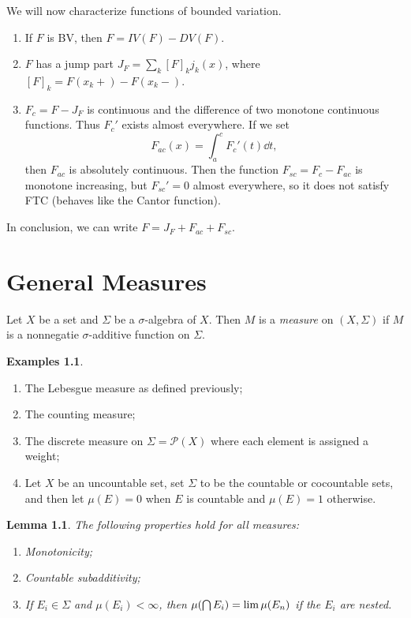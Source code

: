 \documentclass[leqno, openany]{memoir}
\newtheorem{lem}[thm]{Lemma}
\theoremstyle{definition}
\newtheorem{exms}[thm]{Examples}
\theoremstyle{remark}
\theoremstyle{plain}
\theoremstyle{definition}
\theoremstyle{remark}
\newcommand{\mc}[1]{\mathcal{#1}}
\begin{document}
We will now characterize functions of bounded variation.
\begin{enumerate}
    \item If $F$ is BV, then $F = IV(F) - DV(F)$.
    \item $F$ has a jump part $J_F = \sum_k [F]_k j_k(x)$, where $[F]_k = F(x_k+) - F(x_k-)$.
    \item $F_c = F - J_F$ is continuous and the difference of two monotone continuous functions. Thus $F_c'$ exists almost everywhere. If we set
        \[ F_{ac}(x) = \int_a^c F_c'(t) \dd{t}, \]
        then $F_{ac}$ is absolutely continuous. Then the function $F_{sc} = F_c - F_{ac}$ is monotone increasing, but $F_{sc}' = 0$ almost everywhere, so it does not satisfy FTC (behaves like the Cantor function).
\end{enumerate}
In conclusion, we can write $F = J_F + F_{ac} + F_{sc}$.

\chapter{General Measures}%
\label{cha:general_measures}

Let $X$ be a set and $\Sigma$ be a $\sigma$-algebra of $X$. Then $M$ is a \textit{measure} on $(X, \Sigma)$ if $M$ is a nonnegatie $\sigma$-additive function on $\Sigma$.

\begin{exms}
    \begin{enumerate}
        \item The Lebesgue measure as defined previously;
        \item The counting measure;
        \item The discrete measure on $\Sigma = \mc{P}(X)$ where each element is assigned a weight;
        \item Let $X$ be an uncountable set, set $\Sigma$ to be the countable or cocountable sets, and then let $\mu(E) = 0$ when $E$ is countable and $\mu(E) = 1$ otherwise.
    \end{enumerate}
\end{exms}

\begin{lem}
    The following properties hold for all measures:
    \begin{enumerate}
        \item Monotonicity;
        \item Countable subadditivity;
        \item If $E_i \in \Sigma$ and $\mu(E_i) < \infty$, then $\mu \qty(\bigcap E_i) = \lim \mu(E_n)$ if the $E_i$ are nested.
    \end{enumerate}
\end{lem}
\end{document}

